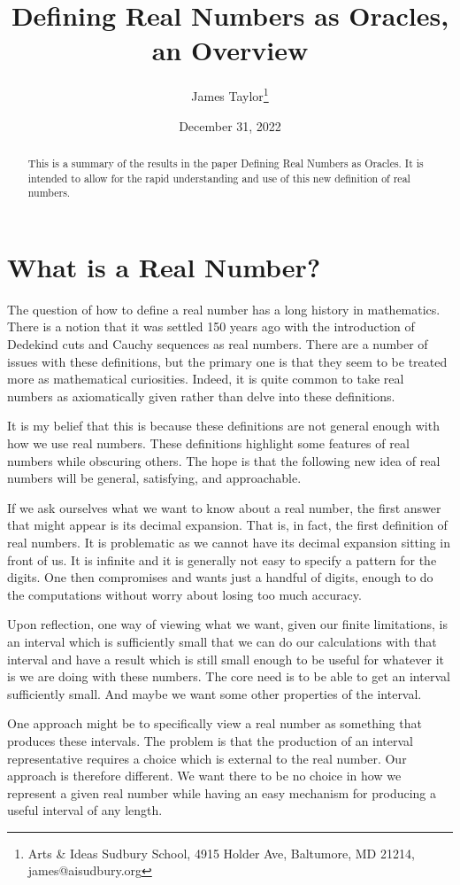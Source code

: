 \documentclass[12pt]{article}
\title{Defining Real Numbers as Oracles, an Overview}
\author{
  James Taylor\footnote{Arts \& Ideas Sudbury School, 4915 Holder Ave, Baltumore, MD 21214, james@aisudbury.org}
}
\date{December 31, 2022}
\theoremstyle{remark}
\begin{document}
\maketitle
\begin{abstract}
This is a summary of the results in the paper Defining Real Numbers as Oracles. It is intended to allow for the rapid understanding and use of this new definition of real numbers. 
\end{abstract}


\section{What is a Real Number?}

The question of how to define a real number has a long history in mathematics. There is a notion that it was settled 150 years ago with the introduction of Dedekind cuts and Cauchy sequences as real numbers. There are a number of issues with these definitions, but the primary one is that they seem to be treated more as mathematical curiosities. Indeed, it is quite common to take real numbers as axiomatically given rather than delve into these definitions. 

It is my belief that this is because these definitions are not general enough with how we use real numbers. These definitions highlight some features of real numbers while obscuring others. The hope is that the following new idea of real numbers will be general, satisfying, and approachable. 

If we ask ourselves what we want to know about a real number, the first answer that might appear is its decimal expansion. That is, in fact, the first definition of real numbers. It is problematic as we cannot have its decimal expansion sitting in front of us. It is infinite and it is generally not easy to specify a pattern for the digits. One then compromises and wants just a handful of digits, enough to do the computations without worry about losing too much accuracy. 

Upon reflection, one way of viewing what we want, given our finite limitations, is an interval which is sufficiently small that we can do our calculations with that interval and have a result which is still small enough to be useful for whatever it is we are doing with these numbers. The core need is to be able to get an interval sufficiently small. And maybe we want some other properties of the interval. 

One approach might be to specifically view a real number as something that produces these intervals. The problem is that the production of an interval representative requires a choice which is external to the real number. Our approach is therefore different. We want there to be no choice in how we represent a given real number while having an easy mechanism for producing a useful interval of any length. 
\end{document}
